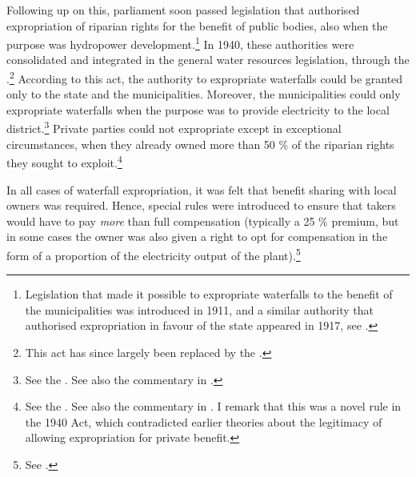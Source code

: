 
Following up on this, parliament soon passed legislation that authorised expropriation of riparian rights for the benefit of public bodies, also when the purpose was hydropower development.\footnote{Legislation that made it possible to expropriate waterfalls to the benefit of the municipalities was introduced in 1911, and a similar authority that authorised expropriation in favour of the state appeared in 1917, see \cite[29]{amundsen28}.} In 1940, these authorities were consolidated and integrated in the general water resources legislation, through the \cite{wra40}.\footnote{This act has since largely been replaced by the \cite{wra00}.} According to this act, the authority to expropriate waterfalls could be granted only to the state and the municipalities. Moreover, the municipalities could only expropriate waterfalls when the purpose was to provide electricity to the local district.\footnote{See the \cite[148]{wra40}. See also the commentary in \cite[201-210]{sorensen41}.} Private parties could not expropriate except in exceptional circumstances, when they already owned more than 50 \% of the riparian rights they sought to exploit.\footnote{See the \cite[55]{wra40}. See also the commentary in \cite[70-74]{sorensen41}. I remark that this was a novel rule in the 1940 Act, which contradicted earlier theories about the legitimacy of allowing expropriation for private benefit.} 

In all cases of waterfall expropriation, it was felt that benefit sharing with local owners was required. Hence, special rules were introduced to ensure that takers would have to pay {\it more} than full compensation (typically a 25 \% premium, but in some cases the owner was also given a right to opt for compensation in the form of a proportion of the electricity output of the plant).\footnote{See \cite[70-91,184,210]{sorensen41}.}

